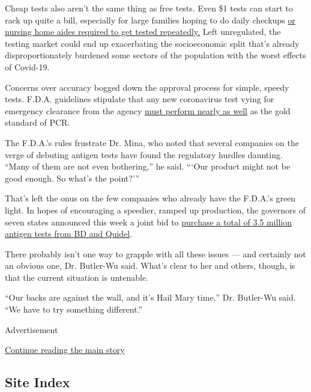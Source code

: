 Cheap tests also aren't the same thing as free tests. Even \$1 tests can
start to rack up quite a bill, especially for large families hoping to
do daily checkups
\href{https://www.nytimes3xbfgragh.onion/2020/06/09/health/testing-coronavirus-nursing-homes-workers.html}{or
nursing home aides required to get tested repeatedly.} Left unregulated,
the testing market could end up exacerbating the socioeconomic split
that's already disproportionately burdened some sectors of the
population with the worst effects of Covid-19.

Concerns over accuracy bogged down the approval process for simple,
speedy tests. F.D.A. guidelines stipulate that any new coronavirus test
vying for emergency clearance from the agency
\href{https://www.fda.gov/news-events/press-announcements/coronavirus-covid-19-update-fda-posts-new-template-home-and-over-counter-diagnostic-tests-use-non}{must
perform nearly as well} as the gold standard of PCR.

The F.D.A.'s rules frustrate Dr. Mina, who noted that several companies
on the verge of debuting antigen tests have found the regulatory hurdles
daunting. ``Many of them are not even bothering,'' he said. ```Our
product might not be good enough. So what's the point?'''

That's left the onus on the few companies who already have the F.D.A.'s
green light. In hopes of encouraging a speedier, ramped up production,
the governors of seven states announced this week a joint bid to
\href{https://governor.maryland.gov/2020/08/04/governors-of-maryland-louisiana-massachusetts-michigan-ohio-and-virginia-announce-major-bipartisan-interstate-compact-for-three-million-rapid-antigen-tests/}{purchase
a total of 3.5 million antigen tests from BD and Quidel}.

There probably isn't one way to grapple with all these issues --- and
certainly not an obvious one, Dr. Butler-Wu said. What's clear to her
and others, though, is that the current situation is untenable.

``Our backs are against the wall, and it's Hail Mary time,'' Dr.
Butler-Wu said. ``We have to try something different.''

Advertisement

\protect\hyperlink{after-bottom}{Continue reading the main story}

\hypertarget{site-index}{%
\subsection{Site Index}\label{site-index}}

